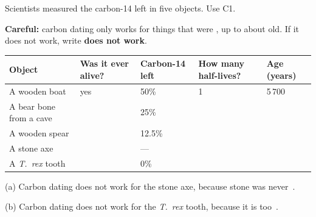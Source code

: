 \documentclass[12pt,a4paper]{article}
\newcommand{\tall}{\rule[-0.9em]{0pt}{2.6em}}
\newcommand{\hrow}{\rowcolor{cbteal!10}}
\newcommand{\starter}[1]{{\leavevmode\color{black!60}#1}}
\begin{document}
\noindent\begin{minipage}{\linewidth}
\noindent Scientists measured the carbon-14 left in five objects. Use C1.

\vspace{4pt}
\noindent\textbf{Careful:} carbon dating only works for things that were
, up to about  old. If it does not work, write
\textbf{does not work}.

\vspace{6pt}
\renewcommand{\arraystretch}{1.2}
\noindent\begin{tabularx}{\linewidth}{|L|C{2.2cm}|C{2.2cm}|C{2.3cm}|C{3.3cm}|}
  \hline
  \hrow \textbf{Object} & \textbf{Was it ever alive?} & \textbf{Carbon-14
    left} & \textbf{How many half-lives?} & \textbf{Age (years)} \\ \hline
  \starter{A wooden boat}\tall & \starter{yes} & \starter{50\%} &
    \starter{1} & \starter{5\,700} \\ \hline
  A bear bone from a cave\tall & & 25\% & & \\ \hline
  A wooden spear\tall & & 12.5\% & & \\ \hline
  A stone axe\tall & & --- & & \\ \hline
  A \textit{T.\ rex} tooth\tall & & 0\% & & \\ \hline
\end{tabularx}

\vspace{3pt}
\end{minipage}

\noindent (a) Carbon dating does not work for the stone axe, because stone
was never \blank[3.2cm]\,.

\vspace{12pt}
\noindent (b) Carbon dating does not work for the \textit{T.\ rex} tooth,
because it is too \blank[3.2cm]\,.

\vspace{2pt}

\end{document}
